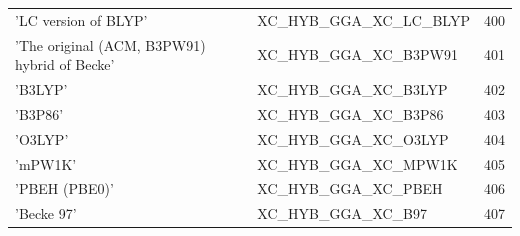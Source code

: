 \documentclass[final,12pt,makeidx,DIV=calc]{article}
\begin{document}
{{{{{{\begin{table}[!h]
\begin{center}
\begin{tabular}{llr}
  'LC version of BLYP' & XC\_HYB\_GGA\_XC\_LC\_BLYP  &400\\
  'The original (ACM, B3PW91) hybrid of Becke' & XC\_HYB\_GGA\_XC\_B3PW91  &401\\
  'B3LYP' & XC\_HYB\_GGA\_XC\_B3LYP  &402\\
  'B3P86' & XC\_HYB\_GGA\_XC\_B3P86  &403\\
  'O3LYP' & XC\_HYB\_GGA\_XC\_O3LYP  &404\\
  'mPW1K' & XC\_HYB\_GGA\_XC\_MPW1K  &405\\
  'PBEH (PBE0)' & XC\_HYB\_GGA\_XC\_PBEH  &406\\
  'Becke 97' & XC\_HYB\_GGA\_XC\_B97  &407\\
\hline
\hline
\end{tabular}
\end{center}
\end{table}

}}}}}}
\end{document}
